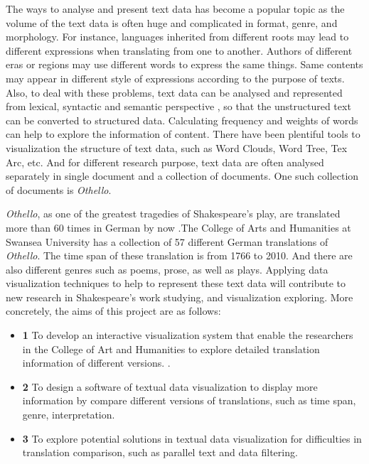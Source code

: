 The ways to analyse and present text data has become a popular topic as the volume of the text data is often huge and complicated in format, genre, and morphology. For instance, languages inherited from different roots may lead to different expressions when translating from one to another. Authors of different eras or regions may use different words to express the same things. Same contents may appear in different style of expressions according to the purpose of texts. Also, to deal with these problems, text data can be analysed and represented from lexical, syntactic and semantic perspective \cite{Ward2015}, so that the unstructured text can be converted to structured data. Calculating frequency and weights of words can help to explore the information of content. There have been plentiful tools to visualization the structure of text data, such as Word Clouds, Word Tree, Tex Arc, etc. And for different research purpose, text data are often analysed separately in single document and a collection of documents. One such collection of documents is \emph{Othello}.

\emph{Othello}, as one of the greatest tragedies of Shakespeare's play, are translated more than 60 times in German by now \cite{Geng2011}.The College of Arts and Humanities at Swansea University has a collection of 57 different German translations of \emph{Othello}. The time span of these translation is from 1766 to 2010. And there are also different genres such as poems, prose, as well as plays. Applying data visualization techniques to help to represent these text data will contribute to new research in Shakespeare’s work studying, and visualization exploring. More concretely, the aims of this project are as follows:

\begin{itemize}
	\item \textbf{1} To develop an interactive visualization system that enable the researchers in the College of Art and Humanities to explore detailed translation information of different versions. .
	\item \textbf{2} To design a software of textual data visualization to display more information by compare different versions of translations, such as time span, genre, interpretation.
	\item \textbf{3} To explore potential solutions in textual data visualization for difficulties in translation comparison, such as parallel text and data filtering.
\end{itemize}

